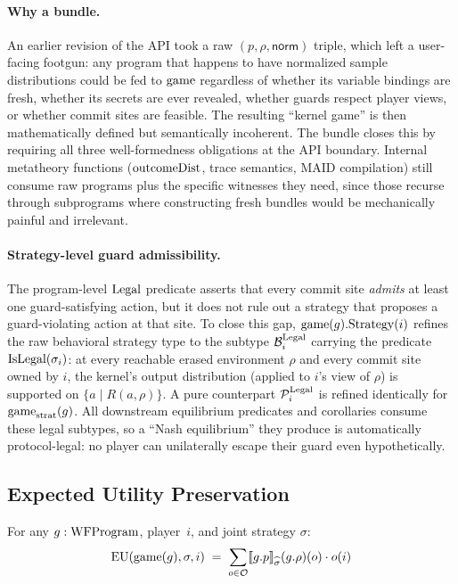\documentclass[11pt]{article}
\begin{document}
\paragraph{Why a bundle.}
An earlier revision of the API took a raw $(p, \rho, \mathsf{norm})$ triple,
which left a user-facing footgun: any program that happens to have
normalized sample distributions could be fed to $\mathrm{game}$ regardless of
whether its variable bindings are fresh, whether its secrets are ever
revealed, whether guards respect player views, or whether commit sites are
feasible. The resulting ``kernel game'' is then mathematically defined but
semantically incoherent. The bundle closes this by requiring all three
well-formedness obligations at the API boundary. Internal metatheory
functions ($\mathrm{outcomeDist}$, trace semantics, MAID compilation) still consume
raw programs plus the specific witnesses they need, since those recurse
through subprograms where constructing fresh bundles would be mechanically
painful and irrelevant.

\paragraph{Strategy-level guard admissibility.}
The program-level $\mathrm{Legal}$ predicate asserts that every commit site
\emph{admits} at least one guard-satisfying action, but it does not rule
out a strategy that proposes a guard-violating action at that site. To
close this gap, $\mathrm{game}(g).\mathrm{Strategy}(i)$ refines the raw behavioral
strategy type to the subtype $\mathcal{B}^{\mathrm{Legal}}_i$ carrying the
predicate $\mathrm{IsLegal}(\sigma_i)$: at every reachable erased environment $\rho$
and every commit site owned by $i$, the kernel's output distribution
(applied to $i$'s view of $\rho$) is supported on $\{a \mid R(a, \rho)\}$.
A pure counterpart $\mathcal{P}^{\mathrm{Legal}}_i$ is refined identically for
$\mathrm{game}_{\mathrm{strat}}(g)$. All downstream equilibrium predicates and corollaries
consume these legal subtypes, so a ``Nash equilibrium'' they produce is
automatically protocol-legal: no player can unilaterally escape their
guard even hypothetically. 

\subsection{Expected Utility Preservation}

\begin{theorem}[EU Preservation]\label{thm:eu}
For any $g : \mathrm{WFProgram}$, player~$i$, and joint strategy $\sigma$:
\[
  \mathrm{EU}(\mathrm{game}(g), \sigma, i) \;=\;
    \sum_{o \in \mathcal{O}} \llbracket g.p \rrbracket_{\widehat{\sigma}}(g.\rho)(o) \cdot o(i)
\]
\end{theorem}
\end{document}
